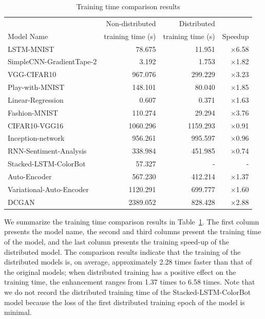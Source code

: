 \begin{table}
  \centering
  \caption{Training time comparison results}
  \label{fig:eval:traintime}
  \begin{tabular}{|l|r|r|r|}
\hline
                         & Non-distributed & Distributed       & \\
Model Name               &  training time (s) & training time (s) &  Speedup\\
\hline
LSTM-MNIST               & 78.675& 11.951& $\times$6.58\\
SimpleCNN-GradientTape-2 & 3.192& 1.753& $\times$1.82\\
VGG-CIFAR10              & 967.076 & 299.229 &$\times$3.23\\
Play-with-MNIST          & 148.101& 80.040& $\times$1.85\\
Linear-Regression        & 0.607& 0.371& $\times$1.63\\
Fashion-MNIST            & 110.274& 29.294& $\times$3.76\\
CIFAR10-VGG16            & 1060.296& 1159.293& $\times$0.91\\
Inception-network        & 956.261& 995.597& $\times$0.96\\
RNN-Sentiment-Analysis   & 338.984& 451.985& $\times$0.74\\
Stacked-LSTM-ColorBot    & 57.327 & -           & -   \\
Auto-Encoder             & 567.230& 412.214& $\times$1.37\\
Variational-Auto-Encoder & 1120.291& 699.777& $\times$1.60\\
DCGAN                    & 2389.052& 828.428& $\times$2.88\\ 
\hline
  \end{tabular}
\end{table}

We summarize the training time comparison results in
Table~\ref{fig:eval:traintime}.
The first column presents the model name, the second and third columns
present the training time of the model, and the last column presents the
training speed-up of the distributed model.
The comparison results indicate that the training of the distributed
models is, on average, approximately 2.28 times faster than that of the
original models; when distributed training has a positive effect on the
training time, the enhancement ranges from 1.37 times to 6.58 times.
Note that we do not record the distributed training time of the
Stacked-LSTM-ColorBot model because the loss of the first distributed training
epoch of the model is minimal.

